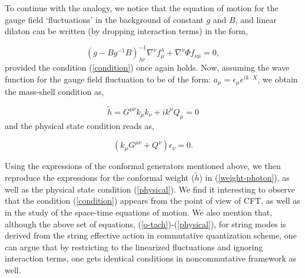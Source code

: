 \documentclass[a4paper,12pt]{article}
\begin{document}
To continue with the analogy, we notice that the equation of motion for 
the gauge field `fluctuations' in the background of constant $g$ and
$B$, and linear dilaton can be written (by dropping interaction terms)
in the form\cite{callan,friedan}, 

\begin{equation}
{(g - B g^{-1} B)}^{-1}_{\lambda \nu}\nabla^{\nu} f_{\mu}^{\lambda}
+ \nabla^{\nu}\Phi f_{\nu \mu} =  0,
\label{o-gauge}
\end{equation}
provided the condition (\ref{condition}) once again holds. 
Now, assuming the wave function for the gauge 
field fluctuation to be of the form:
$a_{\mu} = \epsilon_{\mu} e^{i k\cdot X}$,
we obtain the mass-shell condition as,

\begin{equation}
 \tilde{h} = G^{\mu \nu} k_{\mu} k_{\nu} + i k^{\mu} Q_{\mu} = 0
\label{weight-photon}
\end{equation}
and the physical state condition reads as,

\begin{equation}
(k_{\mu} G^{\mu \nu} + Q^{\nu} ) \epsilon_{\nu} = 0.
\label{physical}
\end{equation}

Using the expressions of the conformal generators mentioned above, 
we then reproduce the expressions for the 
conformal weight ($\tilde{h}$) in (\ref{weight-photon}), 
as well as the physical 
state condition (\ref{physical}). We find it interesting to 
observe that the condition (\ref{condition}) appears from 
the point of 
view of CFT, as well as in the study of the space-time equations of
motion. We also mention that, although the above set of 
equations, (\ref{o-tach})-(\ref{physical}), 
for string modes is derived from the string effective action 
in commutative quantization scheme, one can argue that by 
restricting to the
linearized fluctuations and ignoring interaction terms, one gets 
identical conditions in noncommutative framework as well. 
\end{document}
